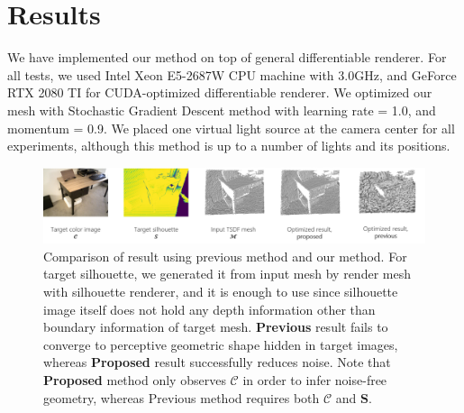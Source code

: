 \section{Results}
We have implemented our method on top of general differentiable renderer\cite{ravi2020accelerating}. 
For all tests, we used Intel Xeon E5-2687W CPU machine with 3.0GHz, and GeForce RTX 2080 TI for CUDA-optimized differentiable renderer. 
We optimized our mesh with Stochastic Gradient Descent method with learning rate = 1.0, and momentum = 0.9. 
We placed one virtual light source at the camera center for all experiments, although this method is up to a number of lights and its positions.

\begin{figure}
    \centering
    \includegraphics[width=\textwidth]{figures/4_result_comparison_with_previous_method.png}
    \caption{Comparison of result using previous method and our method. For target silhouette, we generated it from input mesh by render mesh with silhouette renderer, and it is enough to use since silhouette image itself does not hold any depth information other than boundary information of target mesh. \textbf{Previous} result fails to converge to perceptive geometric shape hidden in target images, whereas \textbf{Proposed} result successfully reduces noise. Note that \textbf{Proposed} method only observes $\mathbf{\mathcal{C}}$ in order to infer noise-free geometry, whereas Previous method requires both $\mathbf{\mathcal{C}}$ and $\mathbf{S}$.}
    \label{fig:comparison_with_previous_method}
\end{figure}

